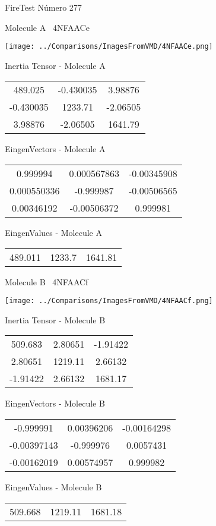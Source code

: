 \vtab[-3cm]
\begin{center}
{\large FireTest \tab Número 277}
\end{center}
\begin{multicols}{2}
\begin{center}

Molecule A \
4NFAACe

\texttt{[image: ../Comparisons/ImagesFromVMD/4NFAACe.png]}

Inertia Tensor - Molecule A \\
\begin{tabular}{|c c c|}
489.025	 & 	-0.430035	 & 	3.98876	 \\
-0.430035	 & 	1233.71	 & 	-2.06505	 \\
3.98876	 & 	-2.06505	 & 	1641.79
\end{tabular}

\vtab
 EingenVectors - Molecule A     \\
\begin{tabular}{|c c c|}
0.999994	 & 	0.000567863	 & 	-0.00345908	 \\
0.000550336	 & 	-0.999987	 & 	-0.00506565	 \\
0.00346192	 & 	-0.00506372	 & 	0.999981
\end{tabular}

\vtab
 EingenValues - Molecule A     \\
\begin{tabular}{|c c c|}
489.011	 & 	1233.7	 & 	1641.81	 \\
\end{tabular}
\columnbreak

Molecule B \
4NFAACf

\texttt{[image: ../Comparisons/ImagesFromVMD/4NFAACf.png]}

Inertia Tensor - Molecule B \\
\begin{tabular}{|c c c|}
509.683	 & 	2.80651	 & 	-1.91422	 \\
2.80651	 & 	1219.11	 & 	2.66132	 \\
-1.91422	 & 	2.66132	 & 	1681.17
\end{tabular}

\vtab
 EingenVectors - Molecule B     \\
\begin{tabular}{|c c c|}
-0.999991	 & 	0.00396206	 & 	-0.00164298	 \\
-0.00397143	 & 	-0.999976	 & 	0.0057431	 \\
-0.00162019	 & 	0.00574957	 & 	0.999982
\end{tabular}

\vtab
 EingenValues - Molecule B     \\
\begin{tabular}{|c c c|}
509.668	 & 	1219.11	 & 	1681.18	 \\
\end{tabular}

\end{center}
\end{multicols}

